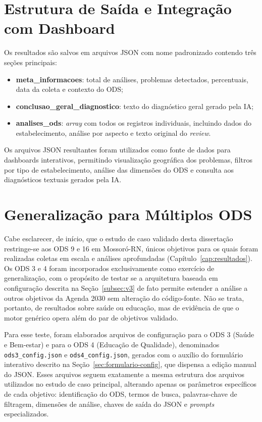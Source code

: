 \section{Estrutura de Saída e Integração com Dashboard}
\label{sec:saida}

Os resultados são salvos em arquivos JSON com nome padronizado contendo três seções principais:

\begin{itemize}
    \item \textbf{meta\_informacoes}: total de análises, problemas detectados, percentuais, data da coleta e contexto do ODS;
    \item \textbf{conclusao\_geral\_diagnostico}: texto do diagnóstico geral gerado pela IA;
    \item \textbf{analises\_ods}: \textit{array} com todos os registros individuais, incluindo dados do estabelecimento, análise por aspecto e texto original do \textit{review}.
\end{itemize}

Os arquivos JSON resultantes foram utilizados como fonte de dados para dashboards interativos, permitindo visualização geográfica dos problemas, filtros por tipo de estabelecimento, análise das dimensões do ODS e consulta aos diagnósticos textuais gerados pela IA.

\section{Generalização para Múltiplos ODS}
\label{sec:generalizacao-multiplos-ods}

Cabe esclarecer, de início, que o estudo de caso validado desta dissertação restringe-se aos ODS 9 e 16 em Mossoró-RN, únicos objetivos para os quais foram realizadas coletas em escala e análises aprofundadas (Capítulo~\ref{cap:resultados}). Os ODS 3 e 4 foram incorporados exclusivamente como exercício de generalização, com o propósito de testar se a arquitetura baseada em configuração descrita na Seção~\ref{subsec:v3} de fato permite estender a análise a outros objetivos da Agenda 2030 sem alteração do código-fonte. Não se trata, portanto, de resultados sobre saúde ou educação, mas de evidência de que o motor genérico opera além do par de objetivos validado.

Para esse teste, foram elaborados arquivos de configuração para o ODS 3 (Saúde e Bem-estar) e para o ODS 4 (Educação de Qualidade), denominados \texttt{ods3\_config.json} e \texttt{ods4\_config.json}, gerados com o auxílio do formulário interativo descrito na Seção~\ref{sec:formulario-config}, que dispensa a edição manual do JSON. Esses arquivos seguem exatamente a mesma estrutura dos arquivos utilizados no estudo de caso principal, alterando apenas os parâmetros específicos de cada objetivo: identificação do ODS, termos de busca, palavras-chave de filtragem, dimensões de análise, chaves de saída do JSON e \textit{prompts} especializados.

